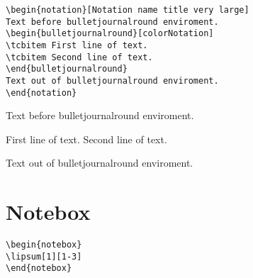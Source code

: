 \lipsum[1][1-3]

\begin{verbatim}
\begin{notation}[Notation name title very large]
Text before bulletjournalround enviroment.
\begin{bulletjournalround}[colorNotation]
\tcbitem First line of text.
\tcbitem Second line of text.
\end{bulletjournalround}
Text out of bulletjournalround enviroment.
\end{notation}
\end{verbatim}
\begin{notation}
Text before bulletjournalround enviroment.
\begin{bulletjournalround}[colorNotation]
\tcbitem First line of text.
\tcbitem Second line of text.
\end{bulletjournalround}
Text out of bulletjournalround enviroment.
\end{notation}


\section{Notebox}

\begin{verbatim}
\begin{notebox}
\lipsum[1][1-3]
\end{notebox}
\end{verbatim}
\begin{notebox}
\lipsum[1][1-3]
\end{notebox}


